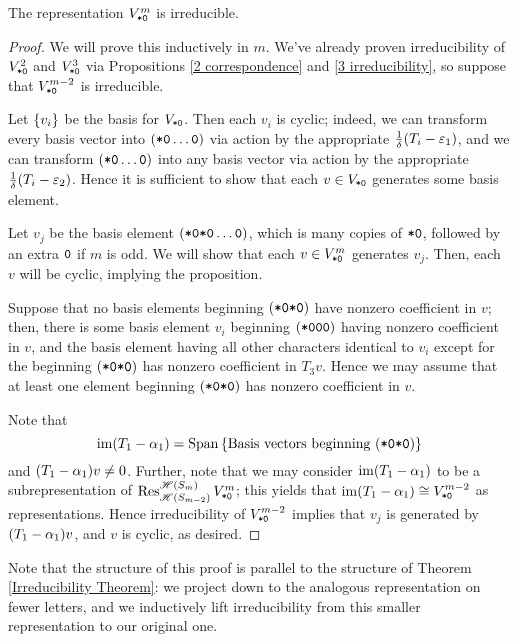 \documentclass{amsart}
\begin{document}
\begin{proposition}\label{Fib irreducibility}
  The representation \emph{$V^m_{\texttt{*}\texttt{0}}$} is irreducible.
\end{proposition}
\begin{proof}
  We will prove this inductively in $m$.
  We've already proven irreducibility of $V^2_{\texttt{*}\texttt{0}}$ and $V^3_{\texttt{*}\texttt{0}}$ via Propositions \ref{2 correspondence} and \ref{3 irreducibility}, so suppose that $V^{m-2}_{\texttt{*}\texttt{0}}$ is irreducible.
  
  Let $\left\{ v_i \right\}$ be the basis for $V_{\texttt{*}\texttt{0}}$.
  Then each $v_i$ is cyclic; indeed, we can transform every basis vector into $(\texttt{*}\texttt{0} \dots \texttt{0})$ via action by the appropriate $\frac{1}{\delta}(T_i - \varepsilon_1)$, and we can transform $(\texttt{*}\texttt{0} \dots \texttt{0})$ into any basis vector via action by the appropriate $\frac{1}{\delta}(T_i - \varepsilon_2)$.
  Hence it is sufficient to show that each $v \in V_{\texttt{*}\texttt{0}}$ generates some basis element.

  Let $v_j$ be the basis element $(\texttt{*}\texttt{0}\texttt{*}\texttt{0}\dots \texttt{0})$, which is many copies of $\texttt{*}\texttt{0}$, followed by an extra $\texttt{0}$ if $m$ is odd.
  We will show that each $v \in V^m_{\texttt{*}\texttt{0}}$ generates $v_j$.
  Then, each $v$ will be cyclic, implying the proposition.

  Suppose that no basis elements beginning $(\texttt{*}\texttt{0}\texttt{*}\texttt{0})$ have nonzero coefficient in $v$;
  then, there is some basis element $v_i$ beginning $(\texttt{*}\texttt{0}\texttt{0}\texttt{0})$ having nonzero coefficient in $v$, and the basis element having all other characters identical to $v_i$ except for the beginning $(\texttt{*}\texttt{0}\texttt{*}\texttt{0})$ has nonzero coefficient in $T_3v$.
  Hence we may assume that at least one element beginning $(\texttt{*}\texttt{0}\texttt{*}\texttt{0})$ has nonzero coefficient in $v$.

  Note that \[\operatorname{im} (T_1 - \alpha_1) = \operatorname{Span}\left\{ \text{Basis vectors beginning }(\texttt{*}\texttt{0}\texttt{*}\texttt{0}) \right\}\] and $(T_1 - \alpha_1)v \neq 0$.
  Further, note that we may consider $\operatorname{im} (T_1 - \alpha_1)$ to be a subrepresentation of $\operatorname{Res}_{\mathscr{H}(S_{m-2})}^{\mathscr{H}(S_m)} V^m_{\texttt{*}\texttt{0}}$;
  this yields that $\operatorname{im} (T_1 - \alpha_1) \cong V^{m-2}_{\texttt{*}\texttt{0}}$ as representations.
  Hence irreducibility of $V^{m-2}_{\texttt{*}\texttt{0}}$ implies that $v_j$ is generated by $(T_1 - \alpha_1)v$, and $v$ is cyclic, as desired.
\end{proof}

Note that the structure of this proof is parallel to the structure of Theorem \ref{Irreducibility Theorem}:
we project down to the analogous representation on fewer letters, and we inductively lift irreducibility from this smaller representation to our original one.
\end{document}
